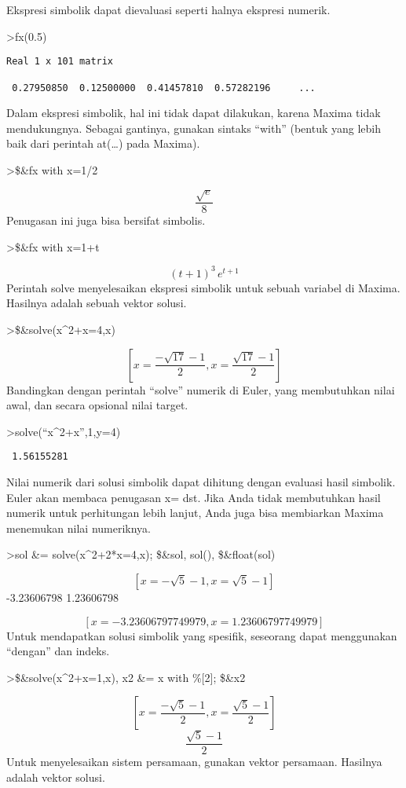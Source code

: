 \documentclass[
]{book}
\begin{document}
Ekspresi simbolik dapat dievaluasi seperti halnya ekspresi numerik.

\textgreater fx(0.5)

\begin{verbatim}
Real 1 x 101 matrix

 0.27950850  0.12500000  0.41457810  0.57282196     ...
\end{verbatim}

Dalam ekspresi simbolik, hal ini tidak dapat dilakukan, karena Maxima tidak mendukungnya. Sebagai gantinya, gunakan sintaks ``with'' (bentuk yang lebih baik dari perintah at(\ldots) pada Maxima).

\textgreater\$\&fx with x=1/2

\[\frac{\sqrt{e}}{8}\]Penugasan ini juga bisa bersifat simbolis.

\textgreater\$\&fx with x=1+t

\[\left(t+1\right)^3\,e^{t+1}\]Perintah solve menyelesaikan ekspresi simbolik untuk sebuah variabel di Maxima. Hasilnya adalah sebuah vektor solusi.

\textgreater\$\&solve(x\^{}2+x=4,x)

\[\left[ x=\frac{-\sqrt{17}-1}{2} , x=\frac{\sqrt{17}-1}{2} \right] \]Bandingkan dengan perintah ``solve'' numerik di Euler, yang membutuhkan nilai awal, dan secara opsional nilai target.

\textgreater solve(``x\^{}2+x'',1,y=4)

\begin{verbatim}
 1.56155281 
\end{verbatim}

Nilai numerik dari solusi simbolik dapat dihitung dengan evaluasi hasil simbolik. Euler akan membaca penugasan x= dst. Jika Anda tidak membutuhkan hasil numerik untuk perhitungan lebih lanjut, Anda juga bisa membiarkan Maxima menemukan nilai numeriknya.

\textgreater sol \&= solve(x\^{}2+2*x=4,x); \$\&sol, sol(), \$\&float(sol)

\[\left[ x=-\sqrt{5}-1 , x=\sqrt{5}-1 \right] \] -3.23606798 1.23606798

\[\left[ x=-3.23606797749979 , x=1.23606797749979 \right] \]Untuk mendapatkan solusi simbolik yang spesifik, seseorang dapat menggunakan ``dengan'' dan indeks.

\textgreater\$\&solve(x\^{}2+x=1,x), x2 \&= x with \%{[}2{]}; \$\&x2

\[\left[ x=\frac{-\sqrt{5}-1}{2} , x=\frac{\sqrt{5}-1}{2} \right] \]\[\frac{\sqrt{5}-1}{2}\]Untuk menyelesaikan sistem persamaan, gunakan vektor persamaan. Hasilnya adalah vektor solusi.
\end{document}

